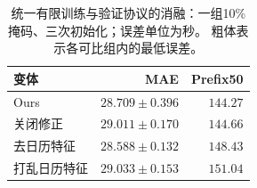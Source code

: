 \begin{table}[t]
\centering\footnotesize\setlength{\tabcolsep}{4pt}
\caption{统一有限训练与验证协议的消融：一组10\%掩码、三次初始化；误差单位为秒。 粗体表示各可比组内的最低误差。}\label{tab:finite_ablation}
\begin{tabular}{lrr}\toprule
变体 & MAE & Prefix50\\\midrule
Ours & $28.709\pm0.396$ & $\mathbf{144.27}$\\
关闭修正 & $29.011\pm0.170$ & $144.66$\\
去日历特征 & $\mathbf{28.588\pm0.132}$ & $148.43$\\
打乱日历特征 & $29.033\pm0.153$ & $151.04$\\
\bottomrule\end{tabular}
\end{table}
